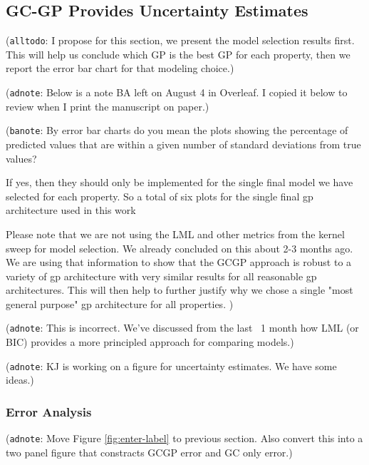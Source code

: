 \documentclass[journal=jacsat,manuscript=article]{achemso}
\newcommand{\alltodo}[1]{{\color{Cyan} (\texttt{alltodo}: #1)}}
\newcommand{\adnote}[1]{{\color{OliveGreen} (\texttt{adnote}: #1)}}
\newcommand{\banote}[1]{{\color{Salmon} (\texttt{banote}: #1)}}
\begin{document}
\subsection{GC-GP Provides Uncertainty Estimates}
\alltodo{I propose for this section, we present the model selection results first. This will help us conclude which GP is the best GP for each property, then we report the error bar chart for that modeling choice.}

\adnote{Below is a note BA left on August 4 in Overleaf. I copied it below to review when I print the manuscript on paper.}

\banote{By error bar charts do you mean the plots showing the percentage of predicted values that are within a given number of standard deviations from true values?

If yes, then they should only be implemented for the single final model we have selected for each property. So a total of six plots for  the single final gp architecture used in this work

Please note that we are not using the LML and other metrics from the kernel sweep for model selection. We already concluded on this about 2-3 months ago. 
We are using that information to show that the GCGP approach is robust to a variety of gp architecture with very similar results for all reasonable gp architectures. This will then help to further justify why we chose a single "most general purpose" gp architecture for all properties. }

\adnote{This is incorrect. We've discussed from the last ~1 month how LML (or BIC) provides a more principled approach for comparing models.}

\adnote{KJ is working on a figure for uncertainty estimates. We have some ideas.}

\subsubsection{Error Analysis}

\adnote{Move Figure \ref{fig:enter-label} to previous section. Also convert this into a two panel figure that constracts GCGP error and GC only error.}
\end{document}
